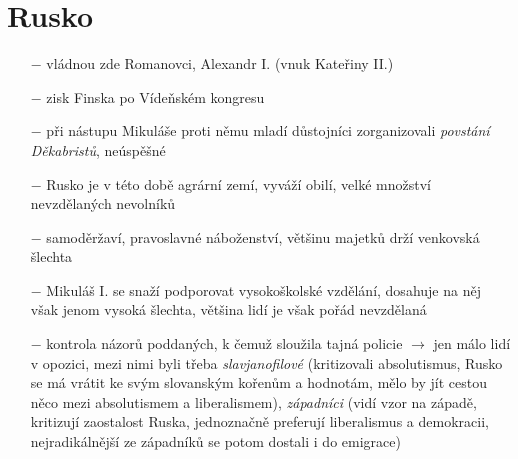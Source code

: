 \documentclass{article}
\begin{document}
\section*{Rusko}

\begin{itemize}
    \vspace{-0.5em}
    \setlength\itemsep{0.15em}
    \item[$-$] vládnou zde Romanovci, Alexandr I. (vnuk Kateřiny II.)
    \item[$-$] zisk Finska po Vídeňském kongresu
    \item[$-$] při nástupu Mikuláše proti němu mladí důstojníci zorganizovali \textit{povstání Děkabristů}, neúspěšné
    \item[$-$] Rusko je v této době agrární zemí, vyváží obilí, velké množství nevzdělaných nevolníků
    \item[$-$] samoděržaví, pravoslavné náboženství, většinu majetků drží venkovská šlechta
    \item[$-$] Mikuláš I. se snaží podporovat vysokoškolské vzdělání, dosahuje na něj však jenom vysoká šlechta, většina lidí je však pořád nevzdělaná
    \item[$-$] kontrola názorů poddaných, k čemuž sloužila tajná policie $\rightarrow$ jen málo lidí v opozici, mezi nimi byli třeba \textit{slavjanofilové} (kritizovali absolutismus, Rusko se má vrátit ke svým slovanským kořenům a hodnotám, mělo by jít cestou něco mezi absolutismem a liberalismem), \textit{západníci} (vidí vzor na západě, kritizují zaostalost Ruska, jednoznačně preferují liberalismus a demokracii, nejradikálnější ze západníků se potom dostali i do emigrace)


\end{itemize}
\end{document}
